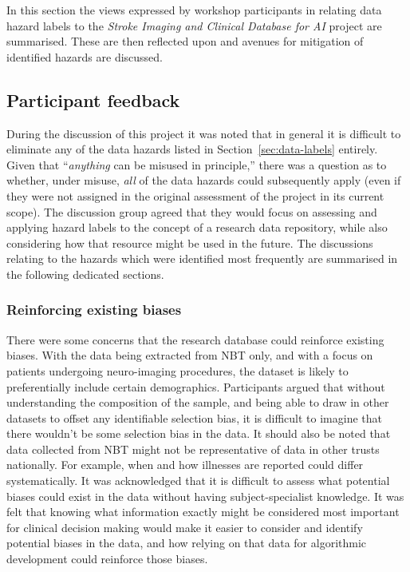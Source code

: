 \documentclass{article}
\begin{document}
In this section the views expressed by workshop participants in
relating data hazard labels to the \textit{Stroke Imaging and Clinical
  Database for AI} project are summarised. These are then reflected
upon and avenues for mitigation of identified hazards are discussed.


\subsection{Participant feedback}

During the discussion of this project it was noted that in general it
is difficult to eliminate any of the data hazards listed in
Section~\ref{sec:data-labels} entirely. Given that ``\textit{anything}
can be misused in principle,'' there was a question as to whether,
under misuse, \textit{all} of the data hazards could subsequently apply (even
if they were not assigned in the original assessment of the project in
its current scope).
The discussion group agreed that they would focus on assessing and
applying hazard labels to the concept of a research data repository,
while also considering how that resource might be used in the
future. The discussions relating to the hazards which were identified
most frequently are summarised in the following dedicated sections. 

\subsubsection{Reinforcing existing biases}
There were some concerns that the research database could reinforce
existing biases. With the data being
extracted from NBT only, and with a focus on patients undergoing
neuro-imaging procedures, the dataset is likely to preferentially
include certain demographics. Participants argued that without understanding the composition of
the sample, and being able to draw in other datasets to offset
any identifiable selection bias, it is difficult to imagine that there
wouldn't be some selection bias in the data. It should also be noted
that data collected from NBT might not be representative of data in
other trusts nationally. For example, when and how
illnesses are reported could differ systematically.
It was acknowledged that it is difficult to assess what potential
biases could exist in the data without having subject-specialist
knowledge. It was felt that knowing what information
exactly might be considered most important for clinical decision
making would make it easier to consider and identify potential biases
in the data, and how relying on that data for algorithmic development
could reinforce those biases. \\ 
\end{document}
